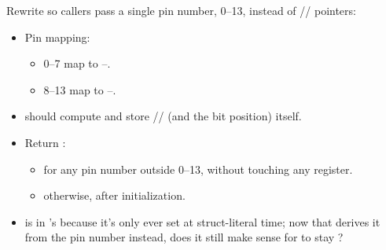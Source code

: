 \label{c9:ex:4}
Rewrite  so callers pass a single pin number, 0--13, instead of
// pointers:
\begin{itemize}
  \item Pin mapping:
  \begin{itemize}
    \item 0--7 map to --.
    \item 8--13 map to --.
  \end{itemize}
  \item {} should compute and store // (and the
    bit position) itself.
  \item Return :
  \begin{itemize}
    \item {} for any pin number outside 0--13, without touching any register.
    \item {} otherwise, after initialization.
  \end{itemize}
  \item {} is  in 's  because it's only ever set
    at struct-literal time; now that  derives it from the pin number instead,
    does it still make sense for  to stay ?
\end{itemize}

